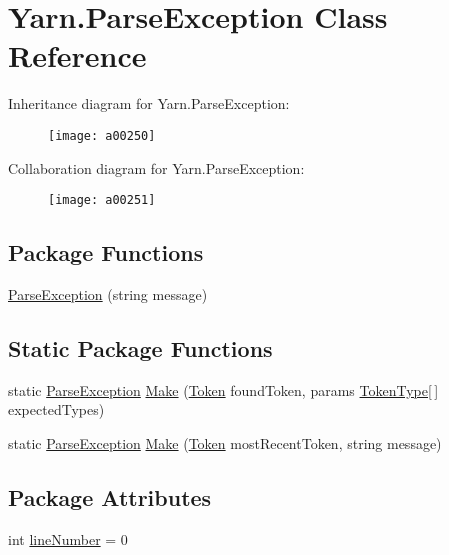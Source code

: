 \hypertarget{a00062}{\section{Yarn.\-Parse\-Exception Class Reference}
\label{a00062}
}


Inheritance diagram for Yarn.\-Parse\-Exception\-:
\nopagebreak
\begin{figure}[H]
\begin{center}
\leavevmode
\texttt{[image: a00250]}
\end{center}
\end{figure}


Collaboration diagram for Yarn.\-Parse\-Exception\-:
\nopagebreak
\begin{figure}[H]
\begin{center}
\leavevmode
\texttt{[image: a00251]}
\end{center}
\end{figure}
\subsection*{Package Functions}
\begin{DoxyCompactItemize}
\item 
\hyperlink{a00062_aa3c4f5c8b0ae86097bbc46044df9f317}{Parse\-Exception} (string message)
\end{DoxyCompactItemize}
\subsection*{Static Package Functions}
\begin{DoxyCompactItemize}
\item 
static \hyperlink{a00062}{Parse\-Exception} \hyperlink{a00062_a511a51bb42dc5bb107eb68f7e5cf5ff1}{Make} (\hyperlink{a00079}{Token} found\-Token, params \hyperlink{a00026_a301aa7c866593a5b625a8fc158bbeace}{Token\-Type}\mbox{[}$\,$\mbox{]} expected\-Types)
\item 
static \hyperlink{a00062}{Parse\-Exception} \hyperlink{a00062_a173f3cabc4741d9d9e016310e90c1c9f}{Make} (\hyperlink{a00079}{Token} most\-Recent\-Token, string message)
\end{DoxyCompactItemize}
\subsection*{Package Attributes}
\begin{DoxyCompactItemize}
\item 
int \hyperlink{a00062_ab335169367e64fd6d89d58b3ac573751}{line\-Number} = 0
\end{DoxyCompactItemize}


